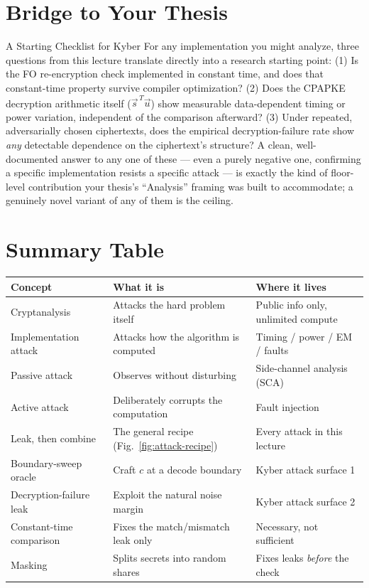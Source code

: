 \section{Bridge to Your Thesis}
\label{sec:L5:bridge-to-your-thesis}

\begin{previewbox}{A Starting Checklist for Kyber}
For any implementation you might analyze, three questions from this lecture translate directly into a research starting point: (1) Is the FO re-encryption check implemented in constant time, and does that constant-time property survive compiler optimization? (2) Does the CPAPKE decryption arithmetic itself ($\vec s^{\,T}\vec u$) show measurable data-dependent timing or power variation, independent of the comparison afterward? (3) Under repeated, adversarially chosen ciphertexts, does the empirical decryption-failure rate show \emph{any} detectable dependence on the ciphertext's structure? A clean, well-documented answer to any one of these --- even a purely negative one, confirming a specific implementation resists a specific attack --- is exactly the kind of floor-level contribution your thesis's ``Analysis'' framing was built to accommodate; a genuinely novel variant of any of them is the ceiling.
\end{previewbox}

\section{Summary Table}
\label{sec:L5:summary-table}

\begin{center}
\renewcommand{\arraystretch}{1.3}
\begin{tabular}{|l|l|l|}
\hline
\textbf{Concept} & \textbf{What it is} & \textbf{Where it lives} \\
\hline
Cryptanalysis & Attacks the hard problem itself & Public info only, unlimited compute \\
Implementation attack & Attacks how the algorithm is computed & Timing / power / EM / faults \\
Passive attack & Observes without disturbing & Side-channel analysis (SCA) \\
Active attack & Deliberately corrupts the computation & Fault injection \\
Leak, then combine & The general recipe (Fig.~\ref{fig:attack-recipe}) & Every attack in this lecture \\
Boundary-sweep oracle & Craft $c$ at a decode boundary & Kyber attack surface 1 \\
Decryption-failure leak & Exploit the natural noise margin & Kyber attack surface 2 \\
Constant-time comparison & Fixes the match/mismatch leak only & Necessary, not sufficient \\
Masking & Splits secrets into random shares & Fixes leaks \emph{before} the check \\
\hline
\end{tabular}
\end{center}


